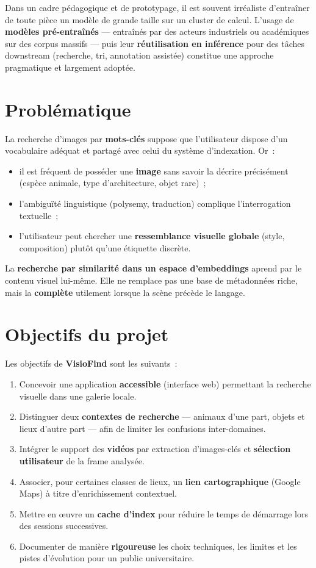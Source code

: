 \documentclass[11pt,a4paper,openany]{report}
\begin{document}
Dans un cadre pédagogique et de prototypage, il est souvent irréaliste d'entraîner de toute pièce un modèle de grande taille sur un cluster de calcul. L'usage de \textbf{modèles pré-entraînés} — entraînés par des acteurs industriels ou académiques sur des corpus massifs — puis leur \textbf{réutilisation en inférence} pour des tâches downstream (recherche, tri, annotation assistée) constitue une approche pragmatique et largement adoptée.

\section{Problématique}

La recherche d'images par \textbf{mots-clés} suppose que l'utilisateur dispose d'un vocabulaire adéquat et partagé avec celui du système d'indexation. Or~:
\begin{itemize}[leftmargin=*]
  \item il est fréquent de posséder une \textbf{image} sans savoir la décrire précisément (espèce animale, type d'architecture, objet rare)~;
  \item l'ambiguïté linguistique (polysemy, traduction) complique l'interrogation textuelle~;
  \item l'utilisateur peut chercher une \textbf{ressemblance visuelle globale} (style, composition) plutôt qu'une étiquette discrète.
\end{itemize}

La \textbf{recherche par similarité dans un espace d'embeddings} aprend par le contenu visuel lui-même. Elle ne remplace pas une base de métadonnées riche, mais la \textbf{complète} utilement lorsque la scène précède le langage.

\section{Objectifs du projet}

Les objectifs de \textbf{VisioFind} sont les suivants~:
\begin{enumerate}[leftmargin=*]
  \item Concevoir une application \textbf{accessible} (interface web) permettant la recherche visuelle dans une galerie locale.
  \item Distinguer deux \textbf{contextes de recherche} — animaux d'une part, objets et lieux d'autre part — afin de limiter les confusions inter-domaines.
  \item Intégrer le support des \textbf{vidéos} par extraction d'images-clés et \textbf{sélection utilisateur} de la frame analysée.
  \item Associer, pour certaines classes de lieux, un \textbf{lien cartographique} (Google Maps) à titre d'enrichissement contextuel.
  \item Mettre en \oe uvre un \textbf{cache d'index} pour réduire le temps de démarrage lors des sessions successives.
  \item Documenter de manière \textbf{rigoureuse} les choix techniques, les limites et les pistes d'évolution pour un public universitaire.
\end{enumerate}
\end{document}
